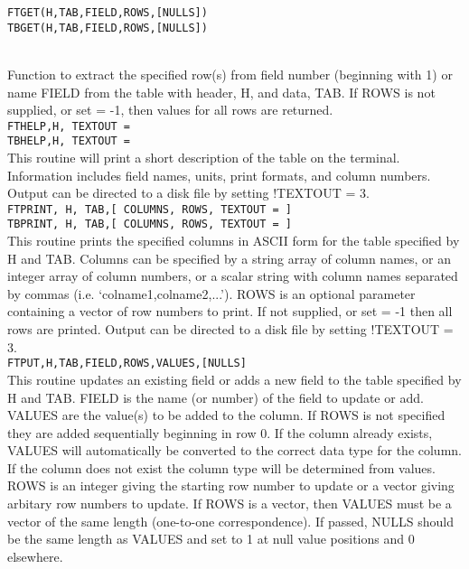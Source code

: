 {\tt FTGET(H,TAB,FIELD,ROWS,[NULLS])}	\\
{\tt TBGET(H,TAB,FIELD,ROWS,[NULLS])}   \\\

	Function to extract the specified row(s) from field
	number (beginning with 1) or name FIELD from the 
        table with header, H, and data, TAB.  If ROWS is not 
        supplied, or set = -1, then values for all rows are 
        returned.  \\

{\tt FTHELP,H, TEXTOUT = } \\
{\tt TBHELP,H, TEXTOUT = } \\

	This routine will print a short description of the table
	on the terminal.  Information includes field names, units,
        print formats, and column numbers. Output can be directed 
        to a disk file by setting !TEXTOUT = 3.  \\

{\tt FTPRINT, H, TAB,[ COLUMNS, ROWS, TEXTOUT = ]} \\
{\tt TBPRINT, H, TAB,[ COLUMNS, ROWS, TEXTOUT = ]} \\

	This routine prints the specified columns in ASCII form
	for the table specified by H and TAB.  Columns can be
	specified by a string array of column names, or an integer
	array of column numbers, or a scalar string with column
	names separated by commas (i.e. `colname1,colname2,...').
	ROWS is an optional parameter containing a vector of row
	numbers to print.  If not supplied, or set = -1 then 
        all rows are printed.  Output can be directed to a disk
        file by setting !TEXTOUT = 3. \\

{\tt  FTPUT,H,TAB,FIELD,ROWS,VALUES,[NULLS]} \\
 
	This routine updates an existing field or adds a new
	field to the table specified by H and TAB.  FIELD
	is the name (or number) of the field to update or add.   
        VALUES are the value(s) to be added to the column.  If 
        ROWS is not specified they are added sequentially 
        beginning in row 0.  If the column already exists, VALUES 
        will automatically be converted to the correct data type 
        for the column.  If the column does not exist the column 
        type will be determined from values.  ROWS is an integer 
        giving the starting row number to update or a vector giving
	arbitary row numbers to update.  If ROWS is a vector, then
	VALUES must be a vector of the same length (one-to-one
	correspondence). If passed, NULLS should be the
        same length as VALUES and set to 1 at null value positions
        and 0 elsewhere. \\
 
